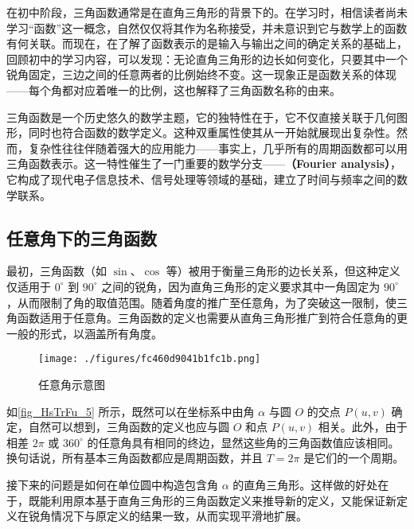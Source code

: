 \begin{issues}
\issueDraft
\end{issues}

在初中阶段，三角函数通常是在直角三角形的背景下的。在学习时，相信读者尚未学习“函数”这一概念，自然仅仅将其作为名称接受，并未意识到它与数学上的函数有何关联。而现在，在了解了函数表示的是输入与输出之间的确定关系的基础上，回顾初中的学习内容，可以发现：无论直角三角形的边长如何变化，只要其中一个锐角固定，三边之间的任意两者的比例始终不变。这一现象正是函数关系的体现——每个角都对应着唯一的比例，这也解释了三角函数名称的由来。

三角函数是一个历史悠久的数学主题，它的独特性在于，它不仅直接关联于几何图形，同时也符合函数的数学定义。这种双重属性使其从一开始就展现出复杂性。然而，复杂性往往伴随着强大的应用能力——事实上，几乎所有的周期函数都可以用三角函数表示。这一特性催生了一门重要的数学分支——\textbf{（Fourier analysis）}，它构成了现代电子信息技术、信号处理等领域的基础，建立了时间与频率之间的数学联系。

\subsection{任意角下的三角函数}

最初，三角函数（如 $\sin$、$\cos$ 等）被用于衡量三角形的边长关系，但这种定义仅适用于 $0^\circ$ 到 $90^\circ$ 之间的锐角，因为直角三角形的定义要求其中一角固定为 $90^\circ$，从而限制了角的取值范围。随着角度的推广至任意角，为了突破这一限制，使三角函数适用于任意角。三角函数的定义也需要从直角三角形推广到符合任意角的更一般的形式，以涵盖所有角度。

\begin{figure}[ht]
\centering
\texttt{[image: ./figures/fc460d9041b1fc1b.png]}
\caption{任意角示意图} \label{fig_HsTrFu_5}
\end{figure}

如\autoref{fig_HsTrFu_5} 所示，既然可以在坐标系中由角 $\alpha$ 与圆 $O$ 的交点 $P(u,v)$ 确定，自然可以想到，三角函数的定义也应与圆 $O$ 和点 $P(u,v)$ 相关。此外，由于相差 $2\pi$ 或 $360^\circ$ 的任意角具有相同的终边，显然这些角的三角函数值应该相同。换句话说，所有基本三角函数都应是周期函数，并且 $T=2\pi$ 是它们的一个周期。

接下来的问题是如何在单位圆中构造包含角 $\alpha$ 的直角三角形。这样做的好处在于，既能利用原本基于直角三角形的三角函数定义来推导新的定义，又能保证新定义在锐角情况下与原定义的结果一致，从而实现平滑地扩展。


